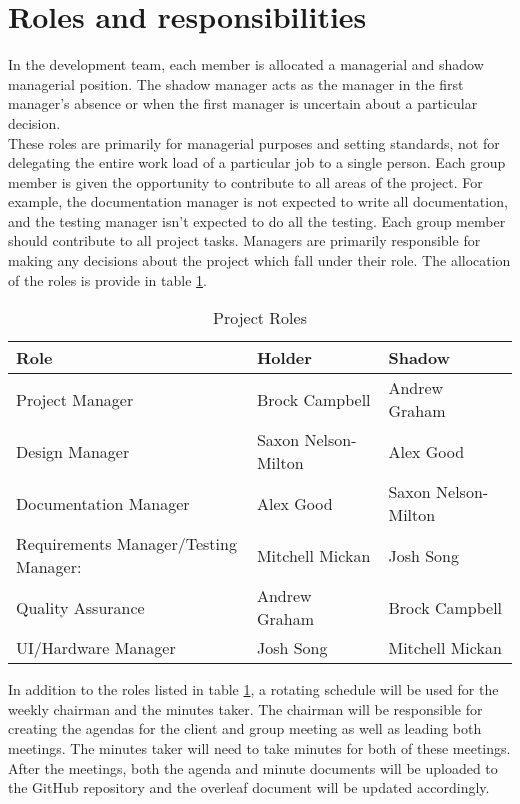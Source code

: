 \documentclass{article}
\begin{document}
\section{Roles and responsibilities}
\begin{adjustwidth}{0em}{0pt}
In the development team, each member is allocated a managerial and shadow managerial position. The shadow manager acts as the manager in the first manager's absence or when the first manager is uncertain about a particular decision.\\
These roles are primarily for managerial purposes and setting standards, not for delegating the entire work load of a particular job to a single person. Each group member is given the opportunity to contribute to all areas of the project. For example, the documentation manager is not expected to write all documentation, and the testing manager isn't expected to do all the testing. Each group member should contribute to all project tasks. Managers are primarily responsible for making any decisions about the project which fall under their role. The allocation of the roles is provide in table \ref{table:Project Roles}.

\begin{table}[ht]
\caption{Project Roles \label{table:Project Roles}}
\centering
\begin{tabular}{|l|l|l|}
	\hline
	\bf Role & \bf Holder & Shadow \\ \hline
	Project Manager & Brock Campbell & Andrew Graham \\ 
	Design Manager & Saxon Nelson-Milton & Alex Good  \\ 
	Documentation Manager & Alex Good & Saxon Nelson-Milton  \\ 
	Requirements Manager/Testing Manager: & Mitchell Mickan & Josh Song  \\ 
	Quality Assurance & Andrew Graham & Brock Campbell  \\ 
    UI/Hardware Manager & Josh Song & Mitchell Mickan  \\ \hline
\end{tabular}
\end{table}

In addition to the roles listed in table \ref{table:Project Roles}, a rotating schedule will be used for the weekly chairman and the minutes taker. The chairman will be responsible for creating the agendas for the client and group meeting as well as leading both meetings. The minutes taker will need to take minutes for both of these meetings. After the meetings, both the agenda and minute documents will be uploaded to the GitHub repository and the overleaf document will be updated  accordingly. 


\end{adjustwidth}
\end{document}
